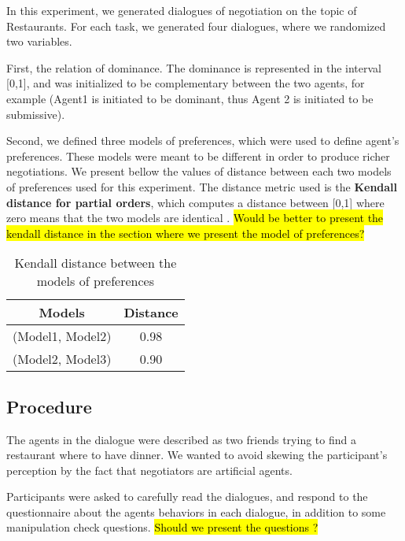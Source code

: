 \documentclass{article}
\begin{document}
				In this experiment, we generated dialogues of negotiation on the topic of Restaurants. For each task, we generated four dialogues, where we randomized two variables. 
				
				First, the relation of dominance. The dominance is represented in the interval [0,1], and was initialized to be complementary between the two agents, for example (Agent1 is initiated to be dominant, thus Agent 2 is initiated to be submissive). 
				
				Second, we defined three models of preferences, which were used to define agent's preferences. These models were meant to be different in order to produce richer negotiations. We present bellow the values of distance between each two models of preferences used for this experiment. The distance metric used is the \textbf{Kendall distance for partial orders}, which computes a distance between [0,1] where zero means that the two models are identical \cite{bra2013Kendall}. \hl{Would be better to present the kendall distance in the section where we present the model of preferences?}
				\begin{table} 
					\centering
					\begin{tabular}{|c|c|}
						\hline
						Models & Distance \\
						\hline
						(Model1, Model2) & 0.98\\
						(Model2, Model3) & 0.90 \\
						\hline
					\end{tabular}
					\caption{Kendall distance between the models of preferences}
				\end{table}
				

			\subsection{Procedure}
			The agents in the dialogue were described as two friends trying to find a restaurant where to have dinner. We wanted to avoid skewing the participant's perception by the fact that negotiators are artificial agents. 
			
			Participants were asked to carefully read the dialogues, and respond to the questionnaire about the agents behaviors in each dialogue, in addition to some manipulation check questions.
			\hl{Should we present the questions ?}
			

			
			
\vskip 4pt


	
\end{document}

